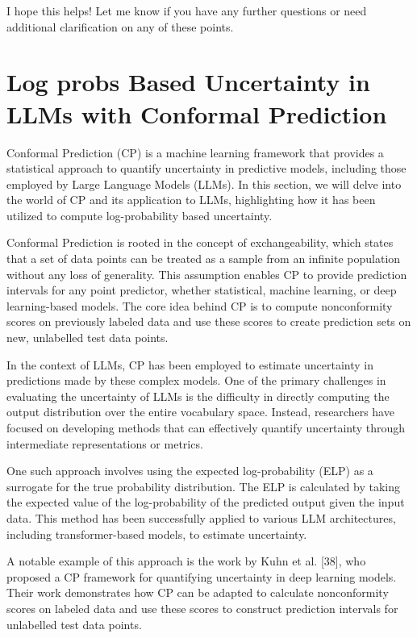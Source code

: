 I hope this helps! Let me know if you have any further questions or need additional
clarification on any of these points.
\section{Log probs Based Uncertainty in LLMs with Conformal Prediction}

Conformal Prediction (CP) is a machine learning framework that provides a statistical
approach to quantify uncertainty in predictive models, including those employed
by Large Language Models (LLMs). In this section, we will delve into the world
of CP and its application to LLMs, highlighting how it has been utilized to compute
log-probability based uncertainty.

Conformal Prediction is rooted in the concept of exchangeability, which states
that a set of data points can be treated as a sample from an infinite population
without any loss of generality. This assumption enables CP to provide prediction
intervals for any point predictor, whether statistical, machine learning, or
deep learning-based models. The core idea behind CP is to compute nonconformity scores
on previously labeled data and use these scores to create prediction sets on new,
unlabelled test data points.

In the context of LLMs, CP has been employed to estimate uncertainty in predictions
made by these complex models. One of the primary challenges in evaluating the
uncertainty of LLMs is the difficulty in directly computing the output
distribution over the entire vocabulary space. Instead, researchers have focused
on developing methods that can effectively quantify uncertainty through
intermediate representations or metrics.

One such approach involves using the expected log-probability (ELP) as a
surrogate for the true probability distribution. The ELP is calculated by taking
the expected value of the log-probability of the predicted output given the input
data. This method has been successfully applied to various LLM architectures, including
transformer-based models, to estimate uncertainty.

A notable example of this approach is the work by Kuhn et al. [38], who proposed
a CP framework for quantifying uncertainty in deep learning models. Their work demonstrates
how CP can be adapted to calculate nonconformity scores on labeled data and use these
scores to construct prediction intervals for unlabelled test data points.

